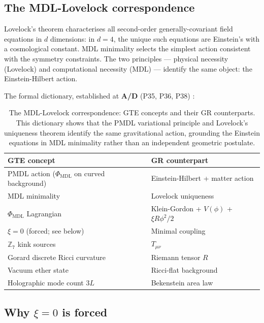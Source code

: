 \documentclass[11pt,openany]{book}
\theoremstyle{remark}
\newcommand{\PHIMDL}{\Phi_{\mathrm{MDL}}}
\newcommand{\ZS}{\mathbb{Z}_7}
\newcommand{\CatAD}{\textbf{A/D}}
\begin{document}
\subsection*{The MDL-Lovelock correspondence}

Lovelock's theorem characterises all second-order generally-covariant field equations in
$d$ dimensions: in $d = 4$, the unique such equations are Einstein's with a cosmological
constant.
MDL minimality selects the simplest action consistent with the symmetry constraints.
The two principles --- physical necessity (Lovelock) and computational necessity (MDL)
--- identify the same object: the Einstein-Hilbert action.

The formal dictionary, established at \CatAD{} (P35, P36, P38) \cite{SpivackEmergentGravity,SpivackPhiMDLGravity}:

\begin{table}[htbp]
\centering
\caption{The MDL-Lovelock correspondence: GTE concepts and their GR counterparts.
This dictionary shows that the PMDL variational principle and Lovelock's uniqueness
theorem identify the same gravitational action, grounding the Einstein equations in
MDL minimality rather than an independent geometric postulate.}
\label{tab:mdl_lovelock}
\renewcommand{\arraystretch}{1.25}
\begin{tabular}{P{5.5cm}P{6.5cm}}
\toprule
GTE concept & GR counterpart \\
\midrule
PMDL action ($\PHIMDL$ on curved background) & Einstein-Hilbert + matter action \\
MDL minimality & Lovelock uniqueness \\
$\PHIMDL$ Lagrangian & Klein-Gordon + $V(\phi)$ + $\xi R\phi^2/2$ \\
$\xi = 0$ (forced; see below) & Minimal coupling \\
$\ZS$ kink sources & $T_{\mu\nu}$ \\
Gorard discrete Ricci curvature & Riemann tensor $R$ \\
Vacuum ether state & Ricci-flat background \\
Holographic mode count $3L$ & Bekenstein area law \\
\bottomrule
\end{tabular}
\end{table}

\subsection*{Why $\xi = 0$ is forced}
\end{document}

